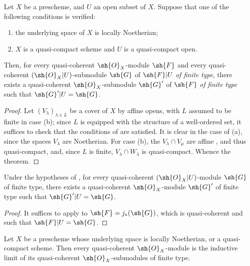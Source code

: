 \begin{theorem}[9.4.7]
\label{I.9.4.7}
Let $X$ be a prescheme, and $U$ an open subset of $X$. Suppose that one of the following conditions is verified:
\begin{enumerate}
  \item[{\rm(a)}] the underlying space of $X$ is locally Noetherian;
  \item[{\rm(b)}] $X$ is a quasi-compact scheme and $U$ is a quasi-compact open.
\end{enumerate}
Then, for every quasi-coherent $\sh{O}_X$-module $\sh{F}$ and every quasi-coherent
$(\sh{O}_X|U)$-submodule $\sh{G}$ of $\sh{F}|U$ \emph{of finite type}, there exists a
quasi-coherent $\sh{O}_X$-submodule $\sh{G}'$ of $\sh{F}$ \emph{of finite type} such that
$\sh{G}'|U=\sh{G}$.
\end{theorem}

\begin{proof}
Let $(V_\lambda)_{\lambda\in L}$ be a cover of $X$ by affine opens, with $L$ assumed to be finite
in case (b); since $L$ is equipped with the structure of a well-ordered set, it suffices to
check that the conditions of  are satisfied. It is clear in the case of (a),
    since the spaces $V_\lambda$ are Noetherian. For case (b), the $V_\lambda\cap V_\mu$ are
affine , and thus quasi-compact, and, since $L$ is finite,
$V_\lambda\cap W_\lambda$ is quasi-compact. Whence the theorem.
\end{proof}

\begin{corollary}[9.4.8]
\label{I.9.4.8}
Under the hypotheses of , for every quasi-coherent $(\sh{O}_X|U)$-module
$\sh{G}$ of finite type, there exists a quasi-coherent $\sh{O}_X$-module $\sh{G}'$ of finite
type such that $\sh{G}'|U=\sh{G}$.
\end{corollary}

\begin{proof}
It suffices to apply  to $\sh{F}=j_*(\sh{G})$, which is quasi-coherent
 and such that $\sh{F}|U=\sh{G}$.
\end{proof}

\begin{corollary}[9.4.9]
\label{I.9.4.9}
Let $X$ be a prescheme whose underlying space is locally Noetherian, or a quasi-compact
scheme. Then every quasi-coherent $\sh{O}_X$-module is the inductive limit of its quasi-coherent
$\sh{O}_X$-submodules of finite type.
\end{corollary}

